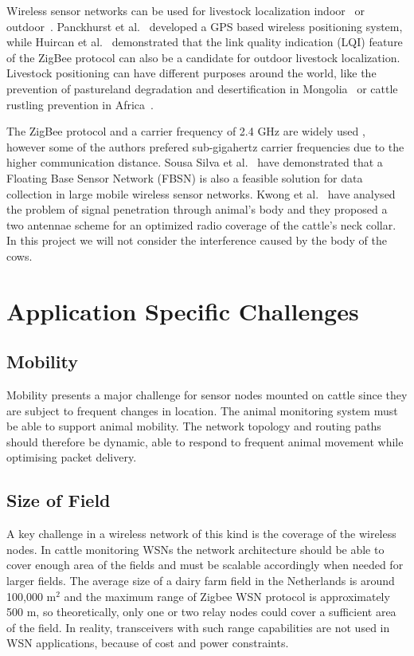 \documentclass[conference]{IEEEtran}
\begin{document}
Wireless sensor networks can be used for livestock localization
indoor~\cite{AS13WI} or outdoor~\cite{PA15SO, HU10ZI}. Panckhurst et
al.~\cite{PA15SO} developed a GPS based wireless positioning system, while
Huircan et al.~\cite{HU10ZI} demonstrated that the link quality indication
(LQI) feature of the ZigBee protocol can also be a candidate for outdoor
livestock localization. Livestock positioning can have different purposes
around the world, like the prevention of pastureland degradation and
desertification in Mongolia~\cite{CH13CL} or cattle rustling prevention in
Africa~\cite{MA14CA}.

The ZigBee protocol and a carrier frequency of 2.4 GHz are widely used
\cite{KU15AZ, MA14CA, HU10ZI, NA12MO}, however some of the authors
\cite{SO05AW, OK12DE, OK13DE, PA15SO} prefered sub-gigahertz carrier
frequencies due to the higher communication distance. Sousa Silva et
al.~\cite{SO05AW} have demonstrated that a Floating Base Sensor Network (FBSN)
is also a feasible solution for data collection in large mobile wireless sensor
networks. Kwong et al.~\cite{KW09WI} have analysed the problem of signal
penetration through animal's body and they proposed a two antennae scheme for
an optimized radio coverage of the cattle's neck collar. In this project we
will not consider the interference caused by the body of the cows.

\section{Application Specific Challenges} \label{sec:cha}

\subsection{Mobility}

Mobility presents a major challenge for sensor nodes mounted on cattle since
they are subject to frequent changes in location.  The animal monitoring system
must be able to support animal mobility. The network topology and routing paths
should therefore be dynamic, able to respond to frequent animal movement while
optimising packet delivery.

\subsection{Size of Field}

A key challenge in a wireless network of this kind is the coverage of the
wireless nodes. In cattle monitoring WSNs the network architecture should be
able to cover enough area of the fields and must be scalable accordingly when
needed for larger fields. The average size of a dairy farm field in the
Netherlands is around 100,000 m$^2$ and the maximum range of Zigbee WSN
protocol is approximately 500 m, so theoretically, only one or two relay nodes
could cover a sufficient area of the field. In reality, transceivers with such
range capabilities are not used in WSN applications, because of cost and power
constraints. 
\end{document}
